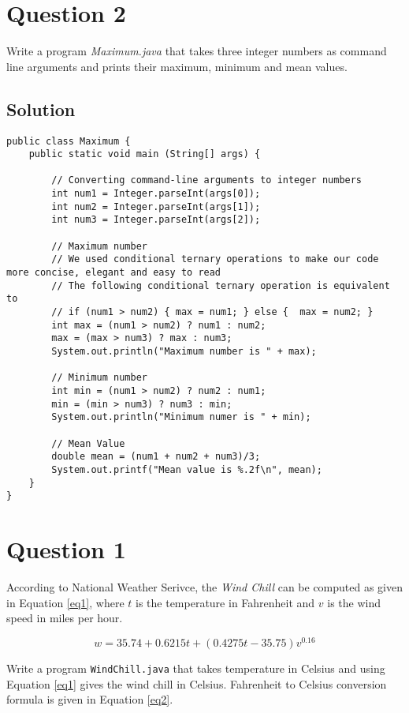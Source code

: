 \documentclass[12pt,letterpaper,twoside]{article}
\begin{document}
\section*{Question 2}

Write a program \textit{Maximum.java} that takes three integer numbers as command line arguments and prints their maximum, minimum and mean values.

\subsection*{Solution}

\lstset{language=Java}
\begin{lstlisting}
public class Maximum {
	public static void main (String[] args) {

		// Converting command-line arguments to integer numbers
		int num1 = Integer.parseInt(args[0]);
		int num2 = Integer.parseInt(args[1]);
		int num3 = Integer.parseInt(args[2]);

		// Maximum number
		// We used conditional ternary operations to make our code more concise, elegant and easy to read
		// The following conditional ternary operation is equivalent to
		// if (num1 > num2) { max = num1; } else {	max = num2; }
		int max = (num1 > num2) ? num1 : num2;
		max = (max > num3) ? max : num3;
		System.out.println("Maximum number is " + max);

		// Minimum number
		int min = (num1 > num2) ? num2 : num1;
		min = (min > num3) ? num3 : min;
		System.out.println("Minimum numer is " + min);

		// Mean Value
		double mean = (num1 + num2 + num3)/3;
		System.out.printf("Mean value is %.2f\n", mean);
	}
}
\end{lstlisting}
\section*{Question 1}

According to National Weather Serivce, the \textit{Wind Chill} can be computed as given in Equation \ref{eq1}, where $t$ is the temperature in Fahrenheit and $v$ is the wind speed in miles per hour.

\begin{equation}
w = 35.74 + 0.6215 t + (0.4275t-35.75)v^{0.16}
\label{eq1}
\end{equation}

Write a program \texttt{WindChill.java} that takes temperature in Celsius and using Equation \ref{eq1} gives the wind chill in Celsius.
Fahrenheit to Celsius conversion formula is given in Equation \ref{eq2}.
\end{document}
